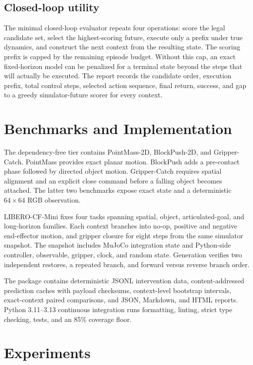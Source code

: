 \documentclass[10pt]{article}
\begin{document}
\subsection{Closed-loop utility}

The minimal closed-loop evaluator repeats four operations: score the legal candidate set,
select the highest-scoring future, execute only a prefix under true dynamics, and construct
the next context from the resulting state. The scoring prefix is capped by the remaining
episode budget. Without this cap, an exact fixed-horizon model can be penalized for a
terminal state beyond the steps that will actually be executed. The report records the
candidate order, execution prefix, total control steps, selected action sequence, final
return, success, and gap to a greedy simulator-future scorer for every context.

\section{Benchmarks and Implementation}

The dependency-free tier contains PointMass-2D, BlockPush-2D, and Gripper-Catch. PointMass
provides exact planar motion. BlockPush adds a pre-contact phase followed by directed
object motion. Gripper-Catch requires spatial alignment and an explicit close command
before a falling object becomes attached. The latter two benchmarks expose exact state
and a deterministic $64\times64$ RGB observation.

LIBERO-CF-Mini fixes four tasks spanning spatial, object, articulated-goal, and long-horizon
families. Each context branches into no-op, positive and negative end-effector motion, and
gripper closure for eight steps from the same simulator snapshot. The snapshot includes
MuJoCo integration state and Python-side controller, observable, gripper, clock, and random
state. Generation verifies two independent restores, a repeated branch, and forward versus
reverse branch order.

The package contains deterministic JSONL intervention data, content-addressed prediction
caches with payload checksums, context-level bootstrap intervals, exact-context paired
comparisons, and JSON, Markdown, and HTML reports. Python 3.11--3.13 continuous integration
runs formatting, linting, strict type checking, tests, and an 85\% coverage floor.

\section{Experiments}
\end{document}
